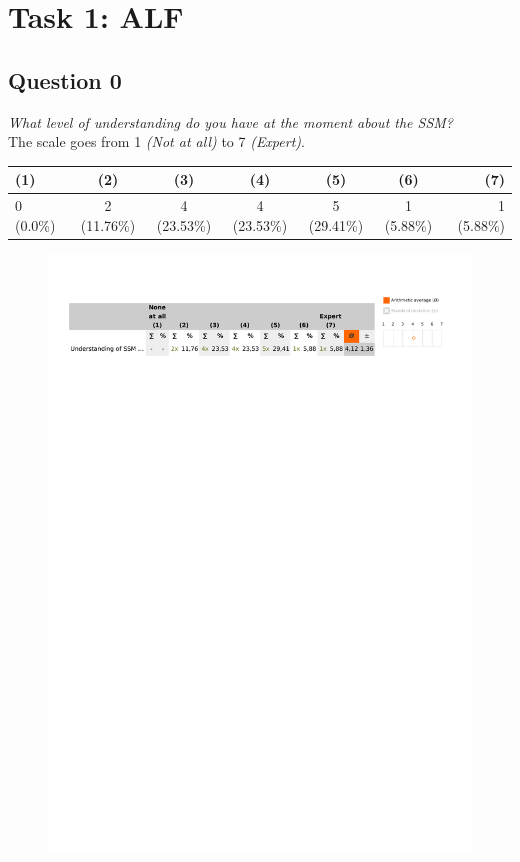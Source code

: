 \section{Task 1: ALF} %
\label{sec:res_alf_task}

\subsection{Question 0}
\emph{What level of understanding do you have at the moment about the SSM?}\\

The scale goes from 1 \emph{(Not at all)} to 7 \emph{(Expert)}.
\begin{table}[H]
	\begin{center}
		\small \begin{tabular*}{1.15\columnwidth}{lcccccr}
			\\ \hline \hline
			(1) & (2) & (3) & (4) & (5) & (6) & (7) \\ \hline \hline

		 	0 (0.0\%) & 2 (11.76\%) & 4 (23.53\%) & 4 (23.53\%) & 5 (29.41\%) & 1 (5.88\%) & 1 (5.88\%)\\ \hline
		\end{tabular*}
	\end{center}
\end{table}

\begin{figure}[H]
	\centering
	\includegraphics[width=0.6\linewidth]{gfx/Chapter_EvaluationResults/ALFTask/question0}
\end{figure}

